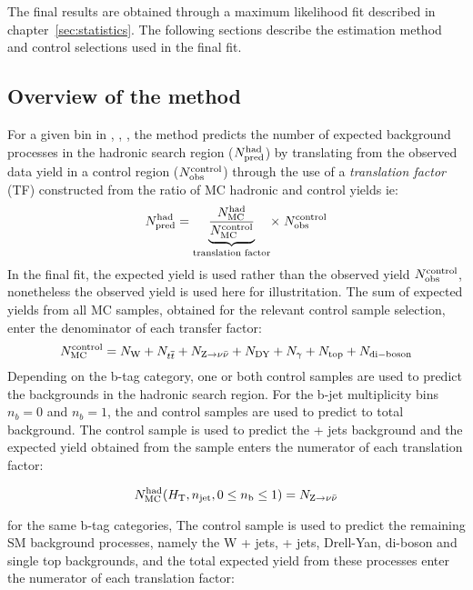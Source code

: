 The final results are obtained through a maximum likelihood fit described
in chapter~\ref{sec:statistics}. The following sections describe 
the estimation method and control selections used in the final fit.

\subsection{Overview of the method\label{sec:background-method}}

For a given bin in \scalht, \njet, \nb, the method predicts the number 
of expected background processes in the hadronic search region ($N_{\textrm{pred}}^{\rm  had}$) 
by translating from the observed data yield in a control region 
($N_{\textrm{obs}}^{\rm  control}$) through the use of a {\it translation factor} 
(TF) constructed from the ratio of MC hadronic and control yields ie:
\begin{equation}
  \label{equ:pred-method}
  N_{\textrm{pred}}^{\rm had} = \underbrace{\frac{N_{\rm MC}^{\rm
      had}}{N_{\rm MC}^{\rm
      control}}}_\text{translation factor}\! \times \; N_{\textrm{obs}}^{\rm
    control}   
\end{equation}
In the ﬁnal ﬁt, the expected yield is used rather than the observed yield
$N_{\textrm{obs}}^{\rm  control}$, nonetheless the observed yield is used here for 
illustritation. The sum of expected yields from all MC samples, obtained for the
relevant control sample selection, enter the denominator of each
transfer factor:
\begin{equation}
  \label{equ:ratio-denom}
  N_{\rm MC}^{\rm control} = N_{\rm W} + N_{\relax{t}\overline{\relax{t}}} + N_{{\text Z} \rightarrow \nu\bar{\nu}} +
N_{\rm DY} + N_{\gamma} + N_{\rm top} + N_{\rm di-boson}
\end{equation}
Depending on the b-tag category, one or both control samples are used 
to predict the backgrounds in the hadronic search region. For the b-jet 
multiplicity bins $n_b = 0$ and $n_b = 1$, the \mj and \gj control samples 
are used to predict to total background. The \gj control
sample is used to predict the \znunu + jets background and the expected yield
obtained from the \znunu sample enters the numerator of each translation
factor:

\begin{equation}
  \label{equ:ratio-numer-gj}
  N_{\rm MC}^{\rm had}(\mbox{$H_\text{T}$},n_{\text{jet}},0 \leq n_{\text{b}} \leq 1) = N_{{\text Z} \rightarrow \nu\bar{\nu}}
\end{equation}

for the same b-tag categories, The \mj control sample is used to predict 
the remaining SM background processes, namely the W + jets, \ttbar + jets,
Drell-Yan, di-boson and single top backgrounds, and the total expected yield
from these processes enter the numerator of each translation factor:

